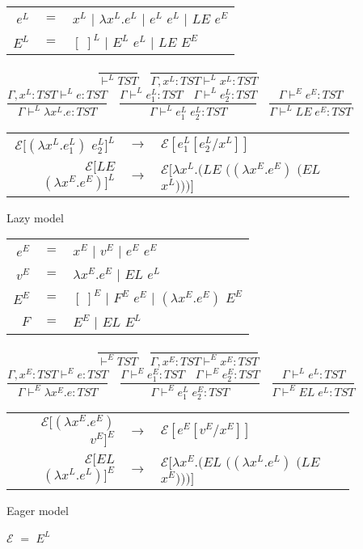 \documentclass[12pt]{ucthesis}
\begin{document}
\begin{figure}[p]
\centering
\begin{tabular}{rcl}
$e^L$ & $=$ & $x^L$ $|$ $\lambda x^L.e^L$ $|$ $e^L$ $e^L$ $|$ $LE$ $e^E$ \\
$E^L$ & $=$ & $[\;]^L$ $|$ $E^L$ $e^L$ $|$ $LE$ $E^E$
\end{tabular}
\[
\frac{}{\vdash^LTST}
\quad
\frac{}{\Gamma,x^L:TST\vdash^Lx^L:TST}
\]
\[
\frac{\Gamma,x^L:TST\vdash^Le:TST}{\Gamma\vdash^L\lambda x^L.e:TST}
\quad
\frac{\Gamma\vdash^Le^L_1:TST\quad\Gamma\vdash^Le^L_2:TST}{\Gamma\vdash^Le^L_1\;e^L_2:TST}
\quad
\frac{\Gamma\vdash^Ee^E:TST}{\Gamma\vdash^LLE\;e^E:TST}
\]
\begin{tabular}{rcl}
$\mathscr{E}[(\lambda x^L.e^L_1)$ $e^L_2]^L$ & $\rightarrow$ & $\mathscr{E}[e^L_1[e^L_2/x^L]]$ \\
$\mathscr{E}[LE$ $(\lambda x^E.e^E)]^L$ & $\rightarrow$ & $\mathscr{E}[\lambda x^L.(LE$ $((\lambda x^E.e^E)$ $(EL$ $x^L)))]$
\end{tabular}
\caption{Lazy model}
\end{figure}

\begin{figure}[p]
\centering
\begin{tabular}{rcl}
$e^E$ & $=$ & $x^E$ $|$ $v^E$ $|$ $e^E$ $e^E$ \\
$v^E$ & $=$ & $\lambda x^E.e^E$ $|$ $EL$ $e^L$ \\
$E^E$ & $=$ & $[\;]^E$ $|$ $F^E$ $e^E$ $|$ $(\lambda x^E.e^E)$ $E^E$ \\
$F$ & $=$ & $E^E$ $|$ $EL$ $E^L$
\end{tabular}
\[
\frac{}{\vdash^ETST}
\quad
\frac{}{\Gamma,x^E:TST\vdash^Ex^E:TST}
\]
\[
\frac{\Gamma,x^E:TST\vdash^Ee:TST}{\Gamma\vdash^E\lambda x^E.e:TST}
\quad
\frac{\Gamma\vdash^Ee^E_1:TST\quad\Gamma\vdash^Ee^E_2:TST}{\Gamma\vdash^Ee^L_1\;e^E_2:TST}
\quad
\frac{\Gamma\vdash^Le^L:TST}{\Gamma\vdash^EEL\;e^L:TST}
\]
\begin{tabular}{rcl}
$\mathscr{E}[(\lambda x^E.e^E)$ $v^E]^E$ & $\rightarrow$ & $\mathscr{E}[e^E[v^E/x^E]]$ \\
$\mathscr{E}[EL$ $(\lambda x^L.e^L)]^E$ & $\rightarrow$ & $\mathscr{E}[\lambda x^E.(EL$ $((\lambda x^L.e^L)$ $(LE$ $x^E)))]$ \\
\end{tabular}
\caption{Eager model}
\end{figure}

\begin{figure}[p]
\centering
$\mathscr{E}$ $=$ $E^L$
\end{figure}
\end{document}
